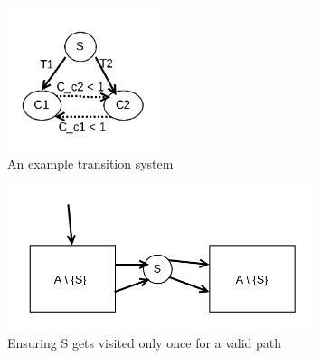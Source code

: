 \begin{figure}
	\centering
	\includegraphics[width=0.4\textwidth]{Figures/automata_rep.png}
	\caption{An example transition system}
	\label{fig:ch5example}
\end{figure}


\begin{figure}
	\centering
	\includegraphics[width=0.8\textwidth]{Figures/automata_state.png}
	\caption{Ensuring S gets visited only once for a valid path}
	\label{fig:ch5example}
\end{figure}

